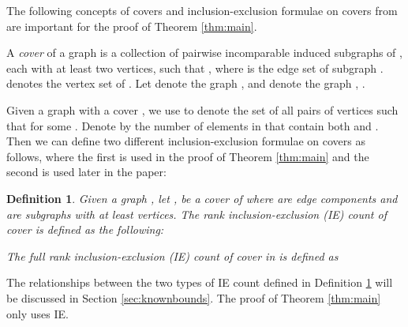 \documentclass[10pt]{article}
\newtheorem{dfn}{Definition}
\begin{document}
\medskip\noindent
The following concepts of covers and inclusion-exclusion formulae on covers from  \cite{crapo:structuralRigidity:1979, sitharam:zhou:tractableADG:2004, andrewThesis, bib:survey, lovasz:yemini, JacksonJordansparse:2005, JacksonJordanrank:2006} are important for the proof of Theorem \ref{thm:main}.


A \emph{cover} of a graph  is a collection 
of pairwise incomparable induced subgraphs  of , each with at least two vertices, such that , where  is the edge set of subgraph .  denotes the vertex set of . Let  denote the graph ,  and  denote the graph , . 


Given a graph  with a cover    , we use  to denote the set of all pairs of vertices  such that  for some . Denote by  the number of elements in  that contain both  and . Then we can define two different inclusion-exclusion formulae on covers as follows, where the first is used in the proof of Theorem \ref{thm:main} and the second is used later in the paper:



\begin{dfn}\label{dfn:IE}
Given a graph , let ,  be a cover of  where  are edge components and  are subgraphs with at least  vertices.
The \emph{rank inclusion-exclusion (IE) count} of cover  is defined as the following:


The \emph{full rank inclusion-exclusion (IE) count} of cover  in is defined as

\end{dfn}

\begin{comment}
The {\em Dress rank inclusion-exclusion (IE) count} of cover  is defined as the following:

The \emph{strong rank inclusion-exclusion (IE) count} of cover  is defined as the following:

\end{comment}

\medskip
\noindent
The relationships between the two types of IE count defined in Definition \ref{dfn:IE} will be discussed in Section \ref{sec:knownbounds}. The proof of Theorem \ref{thm:main} only uses IE.
\end{document}

